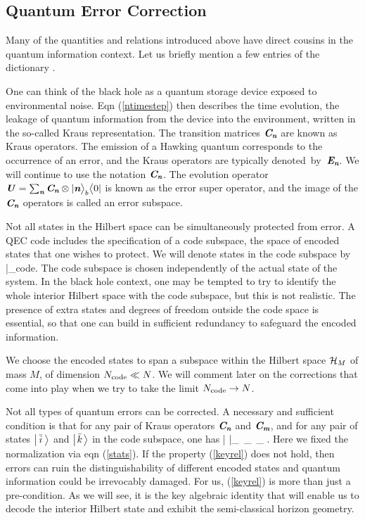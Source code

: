 \documentclass[12pt]{article}%
\def\spc{\hspace{.5pt}}
\begin{document}
\subsection{Quantum Error Correction}

Many of the quantities and relations  introduced above have direct cousins in the 
quantum information context.  Let us briefly mention a few entries of the dictionary \cite{quantuminformation,preskilllectures}.


One can think of the black hole as a quantum storage device exposed to environmental noise. 
Eqn (\ref{ntimestep}) then describes the time evolution, the leakage of quantum information from the device into the environment,
written in the so-called Kraus representation. The transition matrices $\mbox{\textit{\textbf{C}\!\,}}_{ \textit{\textbf n}}$ are known as Kraus operators.
The emission of a Hawking quantum corresponds to the occurrence of an error, and  the Kraus operators are typically denoted~by~$\textit{\textbf E}_{ \textit{\textbf n}}$.
We will continue to use the notation $\mbox{\textit{\textbf{C}\!\,}}_{ \textit{\textbf n}}$. The evolution operator $\mbox{\textit{\textbf{U}}} = \sum_{ \textit{\textbf n}} \mbox{\textit{\textbf{C}\!\,}}_{ \textit{\textbf n}} \otimes  |{ \textit{\textbf n}}\bigr\rangle_{\mbox{\scriptsize $b$}} \bigl\langle 0|$ is known as the error super operator,
and the image of the $\mbox{\textit{\textbf{C}\!\,}}_{ \textit{\textbf n}}$ operators is called an error subspace.

Not all states in the Hilbert space can be simultaneously protected from error.
A QEC code includes the specification of  a code subspace, the space of encoded states that one wishes to protect.  We will
denote states in the code subspace by
\bea
\bigl|\spc \ibar \spc \ra {}_{\rm code}.
\eea
The code subspace is chosen independently of the actual state of the system.  In the black hole context, one may be tempted to try to
identify the whole interior Hilbert space with the code subspace, but this is not realistic. The presence of extra states and degrees of freedom outside
the code space is essential, so that one can build in sufficient redundancy to safeguard the encoded information.  

We choose the encoded states
to span a subspace within the Hilbert space ${\cal H}_M$ of mass $M$, of dimension ${N_{\rm code}}\ll N$. We will comment later on the corrections
that come into play when we try to take the limit ${N_{\rm code}} \to N$.


Not all types of quantum errors can be corrected. A necessary and sufficient condition is that for any pair of Kraus operators $\mbox{\textit{\textbf{C}\!\,}}_{ \textit{\textbf n}}$ and $\mbox{\textit{\textbf{C}\!\,}}_{ \textit{\textbf m}}$, 
and for any pair of states $\bigl|\spc \ibar \spc \ra$ and $\bigl|\spc \kbar \spc \ra$ in the code subspace, one has \cite{quantuminformation,preskilllectures} 
\bea
\label{keyrel}
\la\smpc \ibar \smpc \bigl| \spc {\cC^{\, \dag}_\nomt \cC_\momt} \spc \bigl|\spc \kbar \spc \ra \is \pp_\nom \, \delta_{\nom \mom}\, \delta_{\ibar \! \kbar}.
\eea
Here we fixed the normalization via eqn (\ref{stats}). If the property (\ref{keyrel}) does not hold, then errors can ruin the distinguishability of 
different encoded states and quantum information could be irrevocably damaged. For us,  (\ref{keyrel}) is more than just a pre-condition.
As we will see, it is the key algebraic identity
that will enable us to decode the interior Hilbert state and exhibit the semi-classical horizon geometry.
\end{document}
